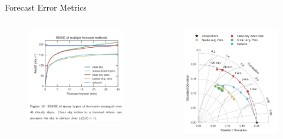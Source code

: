 \documentclass[aspectratio=169]{beamer}
\begin{document}
\begin{frame}{Forecast Error Metrics}
\begin{columns}
\begin{column}{0.4\textwidth}
\begin{figure}[h]
  \includegraphics[width=\textwidth]{figs/network_rmse.png}
\end{figure}
\end{column}
\begin{column}{0.3\textwidth}
\begin{figure}[h]
  \includegraphics[height=.7\textheight]{figs/old_taylor.png}

\end{figure}
\end{column}
\end{columns}
\end{frame}
\end{document}
